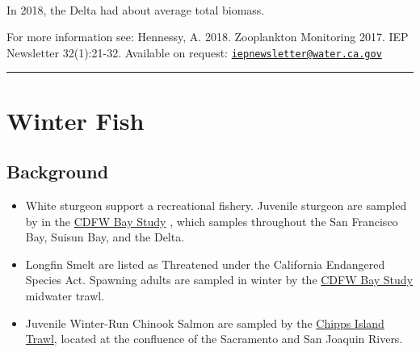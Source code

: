 \documentclass[
]{book}
\providecommand{\tightlist}{%
  \setlength{\itemsep}{0pt}\setlength{\parskip}{0pt}}
\begin{document}
\begin{panel-grid}
\begin{columns-nocenter}
\begin{column800}
\end{column800}

\begin{column40}

~

\end{column40}

\begin{column800}

In 2018, the Delta had about average total biomass.

\end{column800}

\end{columns-nocenter}

\end{panel-grid}

\begin{disclaimer}
For more information see: Hennessy, A. 2018. Zooplankton Monitoring
2017. IEP Newsletter 32(1):21-32. Available on request:
\href{mailto:iepnewsletter@water.ca.gov}{\nolinkurl{iepnewsletter@water.ca.gov}}
\end{disclaimer}

\begin{center}\rule{0.5\linewidth}{0.5pt}\end{center}

\hypertarget{winter-fish}{%
\section{Winter Fish}\label{winter-fish}}

\hypertarget{background-4}{%
\subsection{Background}\label{background-4}}

\begin{itemize}
\tightlist
\item
  White sturgeon support a recreational fishery. Juvenile sturgeon are sampled by in the \href{https://wildlife.ca.gov/Conservation/Delta/Bay-Study}{CDFW Bay Study} , which samples throughout the San Francisco Bay, Suisun Bay, and the Delta.
\item
  Longfin Smelt are listed as Threatened under the California Endangered Species Act. Spawning adults are sampled in winter by the \href{https://wildlife.ca.gov/Conservation/Delta/Bay-Study}{CDFW Bay Study} midwater trawl.
\item
  Juvenile Winter-Run Chinook Salmon are sampled by the \href{https://www.fws.gov/lodi/juvenile_fish_monitoring_program/jfmp_index.htm}{Chipps Island Trawl}, located at the confluence of the Sacramento and San Joaquin Rivers.
\end{itemize}
\end{document}
